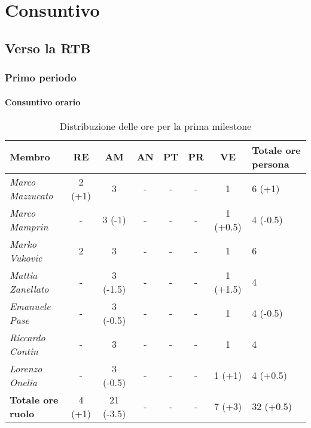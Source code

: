 \chapter{Consuntivo}
\renewcommand\arraystretch{1,2}

\section{Verso la RTB}

\subsection{Primo periodo}

\subsubsection{Consuntivo orario}
\begin{table}[H]
    \centering
    \begin{tabular}{|L{2cm}|c|c|c|c|c|c|C{3cm}|}
    \hline
    \textbf{Membro} & \textbf{RE} & \textbf{AM} & \textbf{AN} & \textbf{PT} & \textbf{PR} & \textbf{VE} & \textbf{Totale ore persona} \\ \hline
    \textit{Marco Mazzucato}  & 2 (+1) & 3        & - & - & - & 1        & 6 (+1)   \\ \hline
    \textit{Marco Mamprin}    & -      & 3 (-1)   & - & - & - & 1 (+0.5) & 4 (-0.5) \\ \hline
    \textit{Marko Vukovic}    & 2      & 3        & - & - & - & 1        & 6        \\ \hline
    \textit{Mattia Zanellato} & -      & 3 (-1.5) & - & - & - & 1 (+1.5) & 4        \\ \hline
    \textit{Emanuele Pase}    & -      & 3 (-0.5) & - & - & - & 1        & 4 (-0.5) \\ \hline
    \textit{Riccardo Contin}  & -      & 3        & - & - & - & 1        & 4        \\ \hline
    \textit{Lorenzo Onelia}   & -      & 3 (-0.5) & - & - & - & 1 (+1)   & 4 (+0.5) \\ \hline
    \textbf{Totale ore ruolo} & 4 (+1) & 21 (-3.5)& - & - & - & 7 (+3)   & 32 (+0.5)\\ \hline
    \end{tabular}
    \caption{Distribuzione delle ore per la prima milestone}
\end{table}

